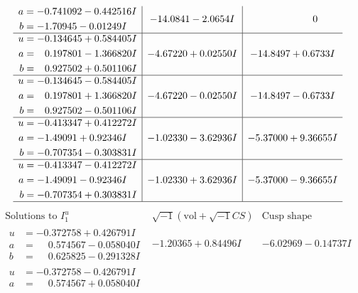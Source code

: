 \documentclass[1p]{elsarticle_modified}
\theoremstyle{definition}
\newcommand{\I}{\sqrt{-1}}
\begin{document}
$$\begin{array}{c|c|c}
\begin{aligned}
a &= -0.741092 - 0.442516 I \\
b &= -1.70945 - 0.01249 I\end{aligned}
 & -14.0841 - 2.0654 I & \phantom{-0.000000 } 0 \\ \hline\begin{aligned}
u &= -0.134645 + 0.584405 I \\
a &= \phantom{-}0.197801 - 1.366820 I \\
b &= \phantom{-}0.927502 + 0.501106 I\end{aligned}
 & -4.67220 + 0.02550 I & -14.8497 + 0.6733 I \\ \hline\begin{aligned}
u &= -0.134645 - 0.584405 I \\
a &= \phantom{-}0.197801 + 1.366820 I \\
b &= \phantom{-}0.927502 - 0.501106 I\end{aligned}
 & -4.67220 - 0.02550 I & -14.8497 - 0.6733 I \\ \hline\begin{aligned}
u &= -0.413347 + 0.412272 I \\
a &= -1.49091 + 0.92346 I \\
b &= -0.707354 - 0.303831 I\end{aligned}
 & -1.02330 - 3.62936 I & -5.37000 + 9.36655 I \\ \hline\begin{aligned}
u &= -0.413347 - 0.412272 I \\
a &= -1.49091 - 0.92346 I \\
b &= -0.707354 + 0.303831 I\end{aligned}
 & -1.02330 + 3.62936 I & -5.37000 - 9.36655 I\\
 \hline 
 \end{array}$$\newpage$$\begin{array}{c|c|c}  
\text{Solutions to }I^u_{1}& \I (\text{vol} + \sqrt{-1}CS) & \text{Cusp shape}\\
 \hline 
\begin{aligned}
u &= -0.372758 + 0.426791 I \\
a &= \phantom{-}0.574567 - 0.058040 I \\
b &= \phantom{-}0.625825 - 0.291328 I\end{aligned}
 & -1.20365 + 0.84496 I & -6.02969 - 0.14737 I \\ \hline\begin{aligned}
u &= -0.372758 - 0.426791 I \\
a &= \phantom{-}0.574567 + 0.058040 I \\

\end{aligned}
\end{array}$$
\end{document}
